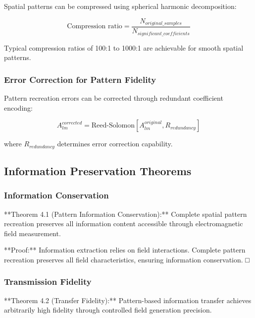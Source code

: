 \documentclass[12pt,a4paper]{article}
\begin{document}
Spatial patterns can be compressed using spherical harmonic decomposition:

\begin{equation}
\text{Compression ratio} = \frac{N_{original\_samples}}{N_{significant\_coefficients}}
\label{eq:pattern_compression}
\end{equation}

Typical compression ratios of 100:1 to 1000:1 are achievable for smooth spatial patterns.

\subsubsection{Error Correction for Pattern Fidelity}

Pattern recreation errors can be corrected through redundant coefficient encoding:

\begin{equation}
A_{lm}^{corrected} = \text{Reed-Solomon}[A_{lm}^{original}, R_{redundancy}]
\label{eq:pattern_error_correction}
\end{equation}

where $R_{redundancy}$ determines error correction capability.

\subsection{Information Preservation Theorems}

\subsubsection{Information Conservation}

**Theorem 4.1 (Pattern Information Conservation):** Complete spatial pattern recreation preserves all information content accessible through electromagnetic field measurement.

**Proof:** Information extraction relies on field interactions. Complete pattern recreation preserves all field characteristics, ensuring information conservation. □

\subsubsection{Transmission Fidelity}

**Theorem 4.2 (Transfer Fidelity):** Pattern-based information transfer achieves arbitrarily high fidelity through controlled field generation precision.
\end{document}
